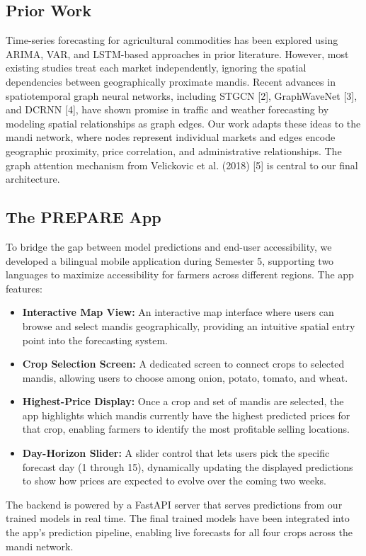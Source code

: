 \documentclass[12pt,a4paper]{article}
\begin{document}
\subsection{Prior Work}
Time-series forecasting for agricultural commodities has been explored using ARIMA, VAR, and LSTM-based approaches in prior literature. However, most existing studies treat each market independently, ignoring the spatial dependencies between geographically proximate mandis. Recent advances in spatiotemporal graph neural networks, including STGCN [2], GraphWaveNet [3], and DCRNN [4], have shown promise in traffic and weather forecasting by modeling spatial relationships as graph edges. Our work adapts these ideas to the mandi network, where nodes represent individual markets and edges encode geographic proximity, price correlation, and administrative relationships. The graph attention mechanism from Velickovic et al. (2018) [5] is central to our final architecture.

\subsection{The PREPARE App}
To bridge the gap between model predictions and end-user accessibility, we developed a bilingual mobile application during Semester 5, supporting two languages to maximize accessibility for farmers across different regions. The app features:

\begin{itemize}
\item \textbf{Interactive Map View:} An interactive map interface where users can browse and select mandis geographically, providing an intuitive spatial entry point into the forecasting system.
\item \textbf{Crop Selection Screen:} A dedicated screen to connect crops to selected mandis, allowing users to choose among onion, potato, tomato, and wheat.
\item \textbf{Highest-Price Display:} Once a crop and set of mandis are selected, the app highlights which mandis currently have the highest predicted prices for that crop, enabling farmers to identify the most profitable selling locations.
\item \textbf{Day-Horizon Slider:} A slider control that lets users pick the specific forecast day (1 through 15), dynamically updating the displayed predictions to show how prices are expected to evolve over the coming two weeks.
\end{itemize}
The backend is powered by a FastAPI server that serves predictions from our trained models in real time. The final trained models have been integrated into the app's prediction pipeline, enabling live forecasts for all four crops across the mandi network.
\end{document}
